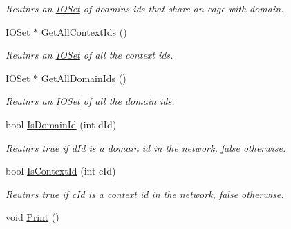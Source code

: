 \begin{DoxyCompactItemize}
\begin{DoxyCompactList}\small\item\em Reutnrs an \hyperlink{class_i_o_set}{IOSet} of doamins ids that share an edge with domain. \item\end{DoxyCompactList}\item 
\hypertarget{class_relation_graph_a3ce2cfa6d1becccfdef2f7fc851026d5}{
\hyperlink{class_i_o_set}{IOSet} $\ast$ \hyperlink{class_relation_graph_a3ce2cfa6d1becccfdef2f7fc851026d5}{GetAllContextIds} ()}
\label{class_relation_graph_a3ce2cfa6d1becccfdef2f7fc851026d5}

\begin{DoxyCompactList}\small\item\em Reutnrs an \hyperlink{class_i_o_set}{IOSet} of all the context ids. \item\end{DoxyCompactList}\item 
\hypertarget{class_relation_graph_ac4d09659ad3e4a4856abe9b15edc0105}{
\hyperlink{class_i_o_set}{IOSet} $\ast$ \hyperlink{class_relation_graph_ac4d09659ad3e4a4856abe9b15edc0105}{GetAllDomainIds} ()}
\label{class_relation_graph_ac4d09659ad3e4a4856abe9b15edc0105}

\begin{DoxyCompactList}\small\item\em Reutnrs an \hyperlink{class_i_o_set}{IOSet} of all the domain ids. \item\end{DoxyCompactList}\item 
\hypertarget{class_relation_graph_ab7cc26b947be79d26f078da0dc1936eb}{
bool \hyperlink{class_relation_graph_ab7cc26b947be79d26f078da0dc1936eb}{IsDomainId} (int dId)}
\label{class_relation_graph_ab7cc26b947be79d26f078da0dc1936eb}

\begin{DoxyCompactList}\small\item\em Reutnrs true if dId is a domain id in the network, false otherwise. \item\end{DoxyCompactList}\item 
\hypertarget{class_relation_graph_adbbbff1b919cf1c4f86620a0bd925cc4}{
bool \hyperlink{class_relation_graph_adbbbff1b919cf1c4f86620a0bd925cc4}{IsContextId} (int cId)}
\label{class_relation_graph_adbbbff1b919cf1c4f86620a0bd925cc4}

\begin{DoxyCompactList}\small\item\em Reutnrs true if cId is a context id in the network, false otherwise. \item\end{DoxyCompactList}\item 
\hypertarget{class_relation_graph_a1a3279bf6ed14795cf41124f9cc730ac}{
void \hyperlink{class_relation_graph_a1a3279bf6ed14795cf41124f9cc730ac}{Print} ()}
\label{class_relation_graph_a1a3279bf6ed14795cf41124f9cc730ac}


\end{DoxyCompactItemize}
